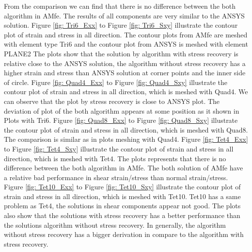From the comparison we can find that there is no difference between the both algorithm in AMfe. The results of all components are very similar to the ANSYS solution. Figure \ref{fig: Tri6_Exx} to Figure \ref{fig: Tri6_Sxy} illustrate the contour plot of strain and stress in all direction. The contour plots from AMfe are meshed with element type Tri6 and the contour plot from ANSYS is meshed with element PLANE2 The plots show that the solution by algorithm with stress recovery is relative close to the ANSYS solution, the algorithm without stress recovery has a higher strain and stress than ANSYS solution at corner points and the inner side of circle. Figure \ref{fig: Quad4_Exx} to Figure \ref{fig: Quad4_Sxy} illustrate the contour plot of strain and stress in all direction, which is meshed with Quad4. We can observe that the plot by stress recovery is close to ANSYS plot. The deviation of plot of the both algorithm appears at some position as it shown in Plots with Tri6.  Figure \ref{fig: Quad8_Exx} to Figure \ref{fig: Quad8_Sxy} illustrate the contour plot of strain and stress in all direction, which is meshed with Quad8. The comparison is similar as in plots meshing with Quad4. Figure \ref{fig: Tet4_Exx} to Figure \ref{fig: Tet4_Sxy} illustrate the contour plot of strain and stress in all direction, which is meshed with Tet4. The plots represents that there is no difference between the both algorithm in AMfe. The both solution of AMfe have a relative bad performance in shear strain/stress than normal strain/stress. Figure \ref{fig: Tet10_Exx} to Figure \ref{fig: Tet10_Sxy} illustrate the contour plot of strain and stress in all direction, which is meshed with Tet10. Tet10 has a same problem as Tet4, the solutions in shear components appear not good. The plots also show that the solutions with stress recovery has a better performance than the solutions algorithm without stress recovery. In generally, the algorithm without stress recovery has a bigger derivation in compare to the algorithm with stress recovery.  

